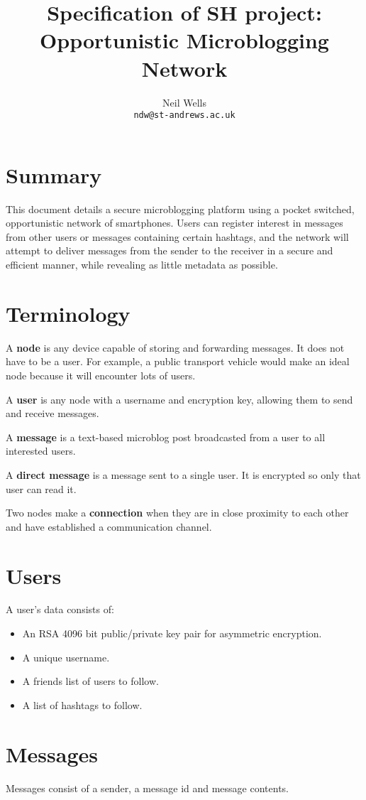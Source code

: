 \documentclass{article}
\title{\textbf{Specification of SH project: Opportunistic Microblogging Network}}
\author{Neil Wells\\
\texttt{ndw@st-andrews.ac.uk}}
\date{}
\begin{document}
\maketitle

\section*{Summary}
This document details a secure microblogging platform using a pocket switched, opportunistic network of smartphones. Users can register interest in messages from other users or messages containing certain hashtags, and the network will attempt to deliver messages from the sender to the receiver in a secure and efficient manner, while revealing as little metadata as possible.


\section*{Terminology}
A \textbf{node} is any device capable of storing and forwarding messages. It does not have to be a user. For example, a public transport vehicle would make an ideal node because it will encounter lots of users.

A \textbf{user} is any node with a username and encryption key, allowing them to send and receive messages.

A \textbf{message} is a text-based microblog post broadcasted from a user to all interested users.

A \textbf{direct message} is a message sent to a single user. It is encrypted so only that user can read it.

Two nodes make a \textbf{connection} when they are in close proximity to each other and have established a communication channel.

\section*{Users}
A user's data consists of:
\begin{itemize}
\item An RSA 4096 bit public/private key pair for asymmetric encryption.
\item A unique username.
\item A friends list of users to follow.
\item A list of hashtags to follow.
\end{itemize}

\section*{Messages}
Messages consist of a sender, a message id and message contents.
\end{document}
